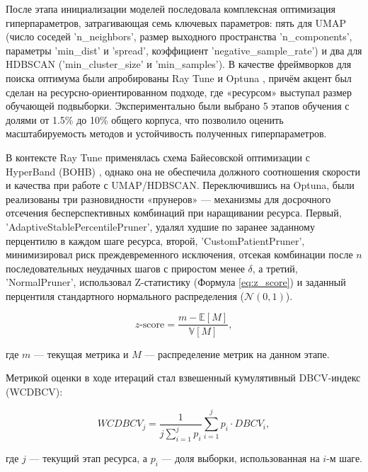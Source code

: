 После этапа инициализации моделей последовала комплексная оптимизация гиперпараметров, затрагивающая
семь ключевых параметров: пять для UMAP (число соседей 'n\_neighbors', размер выходного пространства 'n\_components',
параметры 'min\_dist' и 'spread', коэффициент 'negative\_sample\_rate') и два для HDBSCAN ('min\_cluster\_size' и 'min\_samples').
В качестве фреймворков для поиска оптимума были апробированы Ray Tune \parencite{raytune2018liaw} и Optuna \parencite{optuna2019akiba},
причём акцент был сделан на ресурсно-ориентированном подходе, где «ресурсом» выступал размер обучающей подвыборки.
Экспериментально были выбрано 5 этапов обучения с долями от 1.5\% до 10\% общего корпуса, что позволило
оценить масштабируемость методов и устойчивость полученных гиперпараметров.

В контексте Ray Tune применялась схема Байесовской оптимизации с HyperBand (BOHB)
\parencite{TPEandBO2011bergstra, BOHB2018falkner, hyperband2018li, HPOoverview2015shahriari},
однако она не обеспечила должного соотношения скорости и качества при работе с UMAP/HDBSCAN.
Переключившись на Optuna, были реализованы три разновидности «прунеров» --- механизмы
для досрочного отсечения бесперспективных комбинаций при наращивании ресурса.
Первый, 'AdaptiveStablePercentilePruner', удалял худшие по заранее заданному перцентилю
в каждом шаге ресурса, второй, 'CustomPatientPruner', минимизировал риск преждевременного исключения,
отсекая комбинации после $n$ последовательных неудачных шагов с приростом менее $\delta$, а третий,
'NormalPruner', использовал Z-статистику (Формула \ref{eq:z_score}) и заданный перцентиля стандартного
нормального распределения ($\mathcal{N}(0, 1)$).

\begin{equation}\label{eq:z_score}
    z\text{-score}=\frac{m - \mathbb{E}[M]}{\mathbb{V}[M]},
\end{equation}

где $m$ --- текущая метрика и $M$ --- распределение метрик на данном этапе.

Метрикой оценки в ходе итераций стал взвешенный кумулятивный DBCV-индекс (WCDBCV):

\begin{equation}
    WCDBCV_j=\frac{1}{j\sum_{i=1}^jp_i} \sum_{i=1}^j p_i \cdot DBCV_i,
\end{equation}

где $j$ — текущий этап ресурса, а $p_i$ — доля выборки, использованная на $i$-м шаге.

